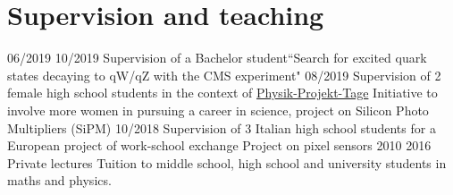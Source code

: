 \section{Supervision and teaching}


  \teaching
    {06/2019 \textemdash{} 10/2019}
    {Supervision of a Bachelor student}{``Search for excited quark states decaying to qW/qZ with the CMS experiment"}
  \teaching
    {08/2019}
    {Supervision of 2 female high school students in the context of \href{https://www.ppt.uni-hamburg.de}{Physik-Projekt-Tage}}
    {Initiative to involve more women in pursuing a career in science, project on Silicon Photo Multipliers (SiPM)}
  \teaching
    {10/2018}
    {Supervision of 3 Italian high school students for a European project of work-school exchange}
    {Project on pixel sensors}
  \teaching
    {2010 \textemdash{} 2016}
    {Private lectures}
    {Tuition to middle school, high school and university students in maths and physics.}
